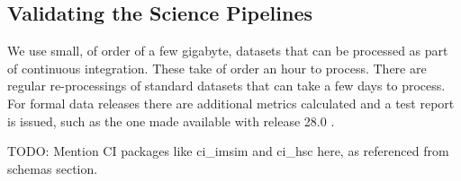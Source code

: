 \subsection{Validating the Science Pipelines}
\label{sec:validation}

We use small, of order of a few gigabyte, datasets that can be processed as part of continuous integration.
These take of order an hour to process.
There are regular re-processings of standard datasets that can take a few days to process.
For formal data releases there are additional metrics calculated and a test report is issued, such as the one made available with release 28.0 \citep{DMTR-451}.

TODO: Mention CI packages like ci\_imsim and ci\_hsc here, as referenced from schemas section.
